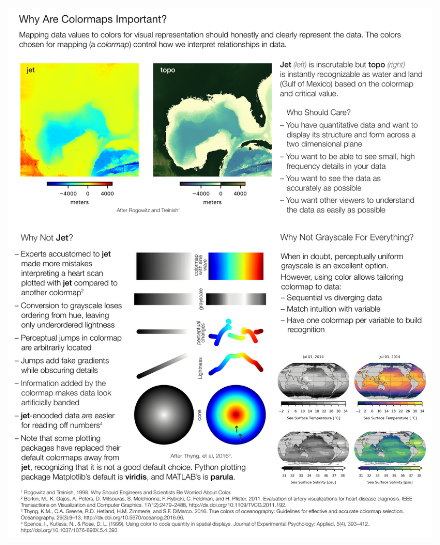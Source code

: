 \documentclass[10pt,journal,compsoc]{IEEEtran}
\begin{document}
\begin{figure}
	\includegraphics[width=\textwidth]{figures/motivation.pdf}
	\caption{}
	\label{fig:motivation}
\end{figure}
\end{document}
